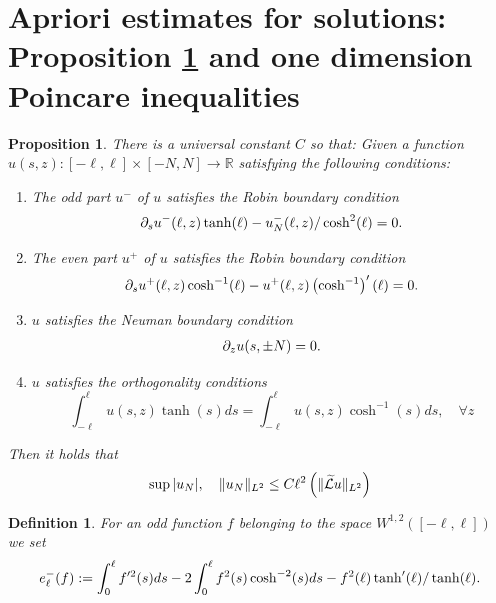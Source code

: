 \documentclass{amsart}
\newtheorem{proposition}{Proposition}
\newtheorem{definition}{Definition}
\newcommand{\mb}{\mathbb}
\newcommand{\mc}{\mathcal}
\newcommand{\wt}{\widetilde}
\begin{document}
  \section{Apriori estimates for solutions:  Proposition \ref{RBCSolutionsIntegralControl} and one dimension Poincare inequalities}\label{Sec:AprioriEstimates}
 \begin{proposition} \label{RBCSolutionsIntegralControl}
 There is a universal constant $C$ so that: Given a function  $u(s, z): [-\ell, \ell] \times [- N, N] \rightarrow \mb{R}$ satisfying the following conditions:
\begin{enumerate}
\item \label{SolutionRobinBoundaryCondition} The odd part $u^{-}$ of $u$ satisfies the Robin boundary condition
\begin{align} \notag
\partial_s u^{-} (\ell, z) \tanh(\ell) - u^{-}_N(\ell, z)/\cosh^2(\ell) = 0.
\end{align}

\item \label{SolutionRobinBoundaryCondition2}  The even part  $u^{+}$ of $u$ satisfies the Robin boundary condition
\begin{align} \notag
\partial_su^{+} (\ell, z) \cosh^{-1}(\ell) - u^{+}(\ell, z)\left(\cosh^{-1}\right)'(\ell) = 0.
\end{align}

\item \label{SolutionNeumanBoundaryCondition} $u$ satisfies the Neuman boundary condition
\begin{align} \notag
\partial_z u(s, \pm N) = 0.
\end{align}
\item  \label{SolutionStrongOrthogonality}  $u$ satisfies the orthogonality conditions
\[
\int_{-\ell}^{\ell} u (s, z)\tanh(s) ds = \int_{-\ell}^{\ell} u (s, z)\cosh^{-1}(s) ds, \quad \forall z
\]
\end{enumerate}
Then it holds that 
 \begin{align} \notag
\sup |u_N|, \quad  \| u_N \|_{L^2}   \leq C \ell^2 \left(\| \wt{\mc{L}} u\|_{L^2}\right)
 \end{align}
 \end{proposition}
 \begin{definition} \label{Dim1Energy}
For an odd function  $f$ belonging to the space $W^{1, 2} ([-\ell, \ell])$ we set
 \begin{align} \notag
 e^{-}_\ell (f) : = \int_0^\ell f'^2 (s) ds - 2 \int_0^\ell f^2(s) \cosh^{-2} (s) ds - f^2 (\ell) \tanh'(\ell)/\tanh(\ell).
 \end{align}
 \end{definition}
\end{document}
